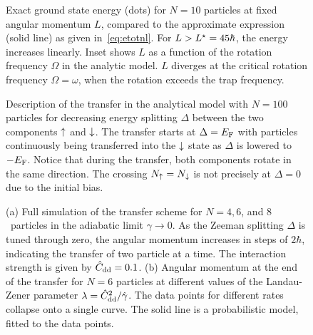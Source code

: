 
\begin{figure}[ht]
    \centering
    \caption{ Exact ground state energy (dots) for $N=10$ particles at fixed angular momentum $L$, compared to the approximate expression (solid line) as given in~\eqref{eq:etotnl}. For $L>L^{\star}=45\hbar$, the energy increases linearly. Inset shows $L$ as a function of the rotation frequency $\Omega$ in the analytic model. $L$ diverges at the critical rotation frequency $\Omega=\omega$, when the rotation exceeds the trap frequency.}
\end{figure}

\begin{figure}[ht]
    \centering
    \caption{Description of the transfer in the analytical model with $N=100$ particles for decreasing energy splitting $\Delta$ between the two components $\uparrow$ and $\downarrow$. The transfer starts at $\Delta=E_\text{F}$ with particles continuously being transferred into the $\downarrow$ state as $\Delta$ is lowered to $-E_\text{F}$. Notice that during the transfer, both components rotate in the same direction. The crossing $N_\uparrow=N_\downarrow$ is not precisely at $\Delta=0$ due to the initial bias.}
\end{figure}

\begin{figure}[ht]
    \centering
    \caption{\label{fig:fig3}(a) Full simulation of the transfer scheme for $N=4,6$, and $8$~particles in the adiabatic limit $\gamma\rightarrow 0$. As the Zeeman splitting $\Delta$ is tuned through zero, the angular momentum increases in steps of $2\hbar$, indicating the transfer of two particle at a time. The interaction strength is given by ${\hat C}_\text{dd}=0.1$. (b) Angular momentum at the end of the transfer for $N=6$ particles at different values of the Landau-Zener parameter $\lambda={\hat C}_\text{dd}^2/{\hat \gamma}$. The data points for different rates collapse onto a single curve. The solid line is a probabilistic model, fitted to the data points.}
\end{figure}


